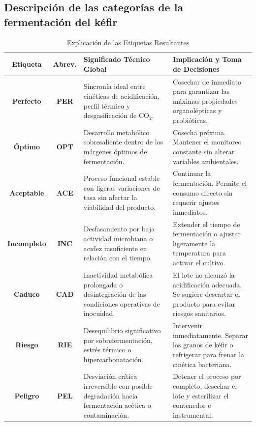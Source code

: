\subsection{Descripción de las categorías de la fermentación del kéfir}

\begin{table}[htbp]
    \centering
    \caption{Explicación de las Etiquetas Resultantes}
    \label{tab:explicacion_etiquetas_globales}
    \begin{tabularx}{\textwidth}{|c|c|>{\raggedright\arraybackslash}p{3.8cm}|X|}
        \hline
        \textbf{Etiqueta} & \textbf{Abrev.} & \textbf{Significado Técnico Global} & \textbf{Implicación y Toma de Decisiones} \\
        \hline
        \textbf{Perfecto} & \textbf{PER} & Sincronía ideal entre cinéticas de acidificación, perfil térmico y desgasificación de $\text{CO}_2$. & Cosechar de inmediato para garantizar las máximas propiedades organolépticas y probióticas. \\
        \hline
        \textbf{Óptimo} & \textbf{OPT} & Desarrollo metabólico sobresaliente dentro de los márgenes óptimos de fermentación. & Cosecha próxima. Mantener el monitoreo constante sin alterar variables ambientales. \\
        \hline
        \textbf{Aceptable} & \textbf{ACE} & Proceso funcional estable con ligeras variaciones de tasa sin afectar la viabilidad del producto. & Continuar la fermentación. Permite el consumo directo sin requerir ajustes inmediatos. \\
        \hline
        \textbf{Incompleto} & \textbf{INC} & Desfasamiento por baja actividad microbiana o acidez insuficiente en relación con el tiempo. & Extender el tiempo de fermentación o ajustar ligeramente la temperatura para activar el cultivo. \\
        \hline
        \textbf{Caduco} & \textbf{CAD} & Inactividad metabólica prolongada o desintegración de las condiciones operativas de inocuidad. & El lote no alcanzó la acidificación adecuada. Se sugiere descartar el producto para evitar riesgos sanitarios. \\
        \hline
        \textbf{Riesgo} & \textbf{RIE} & Desequilibrio significativo por sobrefermentación, estrés térmico o hipercarbonatación. & Intervenir inmediatamente. Separar los granos de kéfir o refrigerar para frenar la cinética bacteriana. \\
        \hline
        \textbf{Peligro} & \textbf{PEL} & Desviación crítica irreversible con posible degradación hacia fermentación acética o contaminación. & Detener el proceso por completo, desechar el lote y esterilizar el contenedor e instrumental. \\
        \hline
    \end{tabularx}
\end{table}